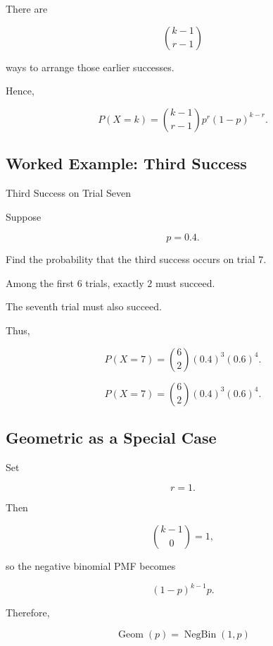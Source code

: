 There are

\[
\binom{k-1}{r-1}
\]

ways to arrange those earlier successes.

Hence,

\[
\boxed{
P(X=k)
=
\binom{k-1}{r-1}
p^r(1-p)^{k-r}.
}
\]

\subsection{Worked Example: Third Success}
\label{subsec:worked-negative-binomial}

\begin{workedexamplebox}{Third Success on Trial Seven}

Suppose

\[
p=0.4.
\]

Find the probability that the third success occurs on trial \(7\).

Among the first \(6\) trials, exactly \(2\) must succeed.

The seventh trial must also succeed.

Thus,

\[
P(X=7)
=
\binom62
(0.4)^3
(0.6)^4.
\]

\begin{answerbox}
\[
\boxed{
P(X=7)
=
\binom62
(0.4)^3
(0.6)^4.
}
\]
\end{answerbox}

\end{workedexamplebox}

\subsection{Geometric as a Special Case}
\label{subsec:geometric-negative-binomial}

Set

\[
r=1.
\]

Then

\[
\binom{k-1}{0}=1,
\]

so the negative binomial PMF becomes

\[
(1-p)^{k-1}p.
\]

Therefore,

\[
\boxed{
\operatorname{Geom}(p)
=
\operatorname{NegBin}(1,p)
}
\]

